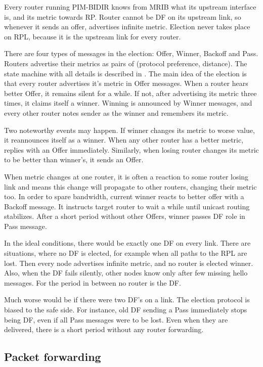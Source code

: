 Every router running PIM-BIDIR knows from MRIB what its upstream interface is,
and its metric towards RP. Router cannot be DF on its upstream link, so
whenever it sends an offer, advertises infinite metric. Election never takes place
on RPL, because it is the upstream link for every router.

There are four types of messages in the election: Offer, Winner, Backoff and
Pass. Routers advertise their metrics as pairs of (protocol preference, distance).
The state machine with all details is described in . The main idea of the
election is that every router advertises it's metric in Offer messages. When
a router hears better Offer, it remains silent for a while. If not, after
advertising its metric three times, it claims itself a winner. Winning is
announced by Winner messages, and every other router notes sender as the
winner and remembers its metric.

Two noteworthy events may happen. If winner changes its metric to worse value,
it reannounces itself as a winner. When any other router has a better metric,
replies with an Offer immediately. Similarly, when losing router changes its
metric to be better than winner's, it sends an Offer.

When metric changes at one router, it is often a reaction to some router losing
link and means this change will propagate to other routers, changing their
metric too. In order to spare bandwidth, current winner reacts to better offer
with a Backoff message. It instructs target router to wait a while until
unicast routing stabilizes. After a short period without other Offers, winner
passes DF role in Pass message.

In the ideal conditions, there would be exactly one DF on every link. There are
situations, where no DF is elected, for example when all paths to the RPL are
lost. Then every node advertises infinite metric, and no router is elected
winner. Also, when the DF fails silently, other nodes know only after few
missing hello messages. For the period in between no router is the DF.

Much worse would be if there were two DF's on a link. The election protocol
is biased to the safe side. For instance, old DF sending a Pass immediately
stops being DF, even if all Pass messages were to be lost. Even when they are
delivered, there is a short period without any router forwarding.

\subsection{Packet forwarding}

